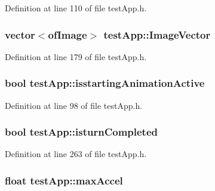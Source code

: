 Definition at line 110 of file test\-App.\-h.

\hypertarget{classtest_app_ad4de5d6e6e8f3b8bb7424e62792deb1f}{
\subsubsection[{Image\-Vector}]{\setlength{\rightskip}{0pt plus 5cm}vector$<$of\-Image$>$ test\-App\-::\-Image\-Vector}}\label{classtest_app_ad4de5d6e6e8f3b8bb7424e62792deb1f}


Definition at line 179 of file test\-App.\-h.

\hypertarget{classtest_app_ab8a277e1055730fb5d6786ce0c4804b2}{
\subsubsection[{isstarting\-Animation\-Active}]{\setlength{\rightskip}{0pt plus 5cm}bool test\-App\-::isstarting\-Animation\-Active}}\label{classtest_app_ab8a277e1055730fb5d6786ce0c4804b2}


Definition at line 98 of file test\-App.\-h.

\hypertarget{classtest_app_a42478a80a90ce9f663c04bcdaea5c5bd}{
\subsubsection[{isturn\-Completed}]{\setlength{\rightskip}{0pt plus 5cm}bool test\-App\-::isturn\-Completed}}\label{classtest_app_a42478a80a90ce9f663c04bcdaea5c5bd}


Definition at line 263 of file test\-App.\-h.

\hypertarget{classtest_app_a34e834a5e4d359700147a74eece8eed1}{
\subsubsection[{max\-Accel}]{\setlength{\rightskip}{0pt plus 5cm}float test\-App\-::max\-Accel}}\label{classtest_app_a34e834a5e4d359700147a74eece8eed1}


